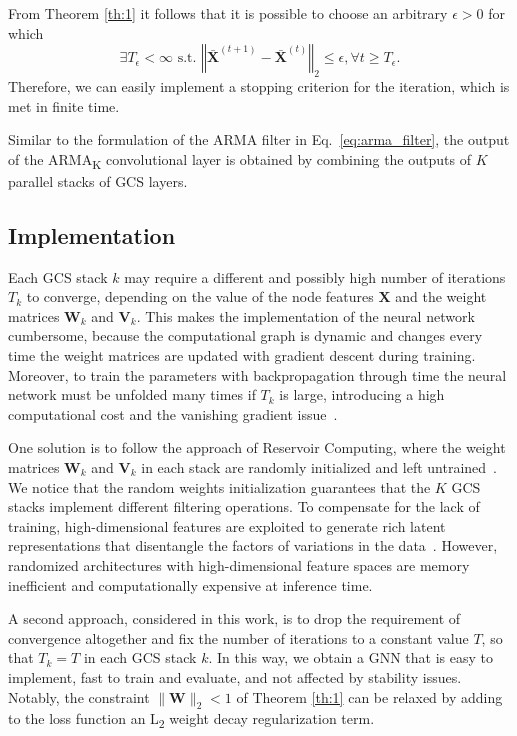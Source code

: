 \documentclass{article}
\def\X{{\mathbf X}}
\def\W{{\mathbf W}}
\def\V{{\mathbf V}}
\begin{document}
From Theorem \ref{th:1} it follows that it is possible to choose an arbitrary $\epsilon > 0$ for which
$$
    \exists T_\epsilon < \infty \text{ s.t. }\left\Vert \bar \X^{(t + 1)} - \bar \X^{(t)} \right\Vert_2 \leq \epsilon, \forall t \geq T_\epsilon.
$$
Therefore, we can easily implement a stopping criterion for the iteration, which is met in finite time.

Similar to the formulation of the ARMA filter in Eq.~\eqref{eq:arma_filter}, the output of the ARMA\textsubscript{K} convolutional layer is obtained by combining the outputs of $K$ parallel stacks of GCS layers.

\subsection{Implementation}
Each GCS stack $k$ may require a different and possibly high number of iterations $T_k$ to converge, depending on the value of the node features $\X$ and the weight matrices $\W_k$ and $\V_k$.
This makes the implementation of the neural network cumbersome, because the computational graph is dynamic and changes every time the weight matrices are updated with gradient descent during training.
Moreover, to train the parameters with backpropagation through time the neural network must be unfolded many times if $T_k$ is large, introducing a high computational cost and the vanishing gradient issue~\cite{bianchi2017recurrent}.

One solution is to follow the approach of Reservoir Computing, where the weight matrices $\W_k$ and $\V_k$ in each stack are randomly initialized and left untrained~\cite{lukovsevivcius2009reservoir, gallicchio2020fast}.
We notice that the random weights initialization guarantees that the $K$ GCS stacks implement different filtering operations. 
To compensate for the lack of training, high-dimensional features are exploited to generate rich latent representations that disentangle the factors of variations in the data~\cite{tino2020dynamical}.
However, randomized architectures with high-dimensional feature spaces are memory inefficient and computationally expensive at inference time.

A second approach, considered in this work, is to drop the requirement of convergence altogether and fix the number of iterations to a constant value $T$, so that $T_k = T$ in each GCS stack $k$.
In this way, we obtain a GNN that is easy to implement, fast to train and evaluate, and not affected by stability issues.
Notably, the constraint $\| \W \|_2 < 1$ of Theorem \ref{th:1} can be relaxed by adding to the loss function an L\textsubscript{2} weight decay regularization term.
\end{document}
